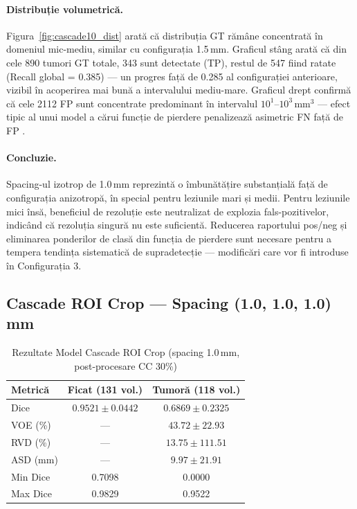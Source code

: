 \documentclass[12pt, a4paper]{report}
\begin{document}
\paragraph{Distribuție volumetrică.}
Figura~\ref{fig:cascade10_dist} arată că distribuția GT rămâne concentrată în domeniul mic-mediu, similar cu configurația 1.5\,mm. Graficul stâng arată că din cele 890 tumori GT totale, 343 sunt detectate (TP), restul de 547 fiind ratate (Recall global = 0.385) — un progres față de 0.285 al configurației anterioare, vizibil în acoperirea mai bună a intervalului mediu-mare. Graficul drept confirmă că cele 2112 FP sunt concentrate predominant în intervalul $10^1$–$10^3$\,mm$^3$ — efect tipic al unui model a cărui funcție de pierdere penalizează asimetric FN față de FP .


\paragraph{Concluzie.}
Spacing-ul izotrop de 1.0\,mm reprezintă o îmbunătățire substanțială față de configurația anizotropă, în special pentru leziunile mari și medii. Pentru leziunile mici însă, beneficiul de rezoluție este neutralizat de explozia fals-pozitivelor, indicând că rezoluția singură nu este suficientă. Reducerea raportului pos/neg și eliminarea ponderilor de clasă din funcția de pierdere sunt necesare pentru a tempera tendința sistematică de supradetecție — modificări care vor fi introduse în Configurația 3.

\subsection{Cascade ROI Crop — Spacing (1.0, 1.0, 1.0) mm}

\begin{table}[H]
\centering
\caption{Rezultate Model Cascade ROI Crop (spacing 1.0\,mm, post-procesare CC 30\%)}
\label{tab:roi_seg}
\begin{tabular}{lcc}
\hline
\textbf{Metrică} & \textbf{Ficat (131 vol.)} & \textbf{Tumoră (118 vol.)} \\
\hline
Dice              & $0.9521 \pm 0.0442$ & $0.6869 \pm 0.2325$ \\
VOE (\%)          & ---                 & $43.72 \pm 22.93$ \\
RVD (\%)          & ---                 & $13.75 \pm 111.51$ \\
ASD (mm)          & ---                 & $9.97 \pm 21.91$ \\
Min Dice          & 0.7098              & 0.0000 \\
Max Dice          & 0.9829              & 0.9522 \\
\hline
\end{tabular}
\end{table}
\end{document}
